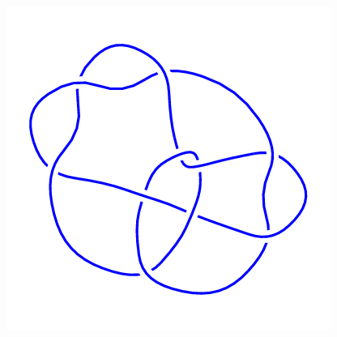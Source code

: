 \begin{figure}[H]
\begin{minipage}[b]{.18\linewidth}
	\end{minipage}
	\begin{minipage}[b]{.18\linewidth}
		\centering
		\includegraphics[width=\linewidth]{../data/10_106.png}
	\end{minipage}
\end{figure}
